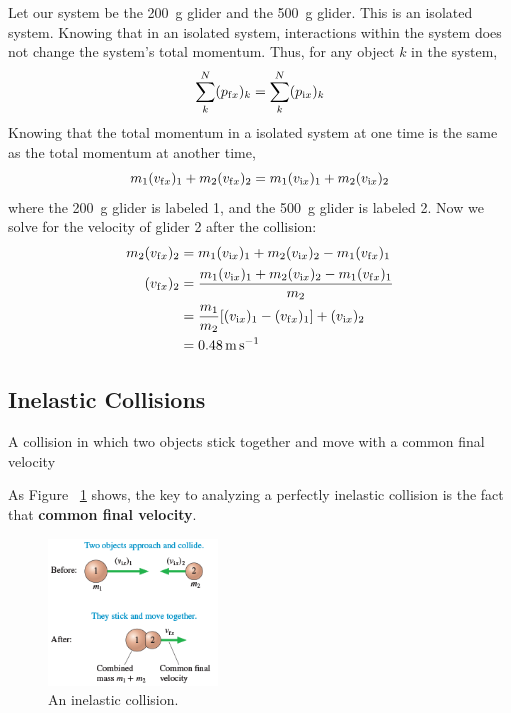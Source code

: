 \begin{Answer}
    Let our system be the \SI{200}{\gram} glider and the \SI{500}{\gram}
    glider.  This is an isolated system.  Knowing that in an isolated
    system, interactions within the system does not change the system's
    total momentum.  Thus, for any object
    $
        k
    $ in the system,
    \begin{equation}
        \sum_k^N (p_{\mathrm{f} x})_k = \sum_k^N (p_{\mathrm{i} x})_k
    \end{equation}
    Knowing that the total momentum in a isolated system at one time is
    the same as the total momentum at another time,
    \begin{equation}
        m_1(v_{\mathrm{f} x})_1 + m_2(v_{\mathrm{f} x})_2 = m_1(v_{\mathrm{i} x})_1 + m_2(v_
        {\mathrm{i} x})_2
    \end{equation}
    where the \SI{200}{\gram} glider is labeled 1, and the \SI{500}{\gram}
    glider is labeled 2.  Now we solve for the velocity of glider 2
    after the collision:
    \begin{align}
        m_2(v_{\mathrm{f} x})_2 &= m_1(v_{\mathrm{i} x})_1 + m_2(v_{\mathrm{i} x})_2 - m_1
        (v_{\mathrm{f} x})_1 \\
        (v_{\mathrm{f} x})_2 &= \frac{m_1(v_{\mathrm{i} x})_1 + m_2(v_ {\mathrm{i} x})_2 -
        m_1(v_{\mathrm{f} x})_1}{m_2} \\
        &=\frac{m_1}{m_2}[(v_{\mathrm{i} x})_1 - (v_{\mathrm{f} x})_1] + (v_{\mathrm{i} x})_2
        \\
        &=\qty{0.48}{\metre\per\second}
    \end{align}
\end{Answer}

\subsection{Inelastic Collisions}

\begin{definition}
    A collision in which two objects stick together and move with a
    common final velocity
\end{definition}

As Figure~%
\ref{fig:inelastic-collision} shows, the key to analyzing a perfectly
inelastic collision is the fact that \textbf{common final velocity}.

\begin{figure}
    \centering
    \includegraphics[width=0.4\textwidth]{../figures/an-inelastic-collision.png}
    \caption{An inelastic collision.}%
    \label{fig:inelastic-collision}
\end{figure}

